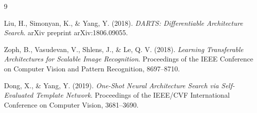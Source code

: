 \documentclass[a4paper,11pt]{article}
\begin{document}
\begin{thebibliography}{9}

Liu, H., Simonyan, K., \& Yang, Y. (2018).
\textit{DARTS: Differentiable Architecture Search}.
arXiv preprint arXiv:1806.09055.

Zoph, B., Vasudevan, V., Shlens, J., \& Le, Q. V. (2018).
\textit{Learning Transferable Architectures for Scalable Image Recognition}.
Proceedings of the IEEE Conference on Computer Vision and Pattern Recognition, 8697--8710.

Dong, X., \& Yang, Y. (2019).
\textit{One-Shot Neural Architecture Search via Self-Evaluated Template Network}.
Proceedings of the IEEE/CVF International Conference on Computer Vision, 3681--3690.

\end{thebibliography}
\end{document}
